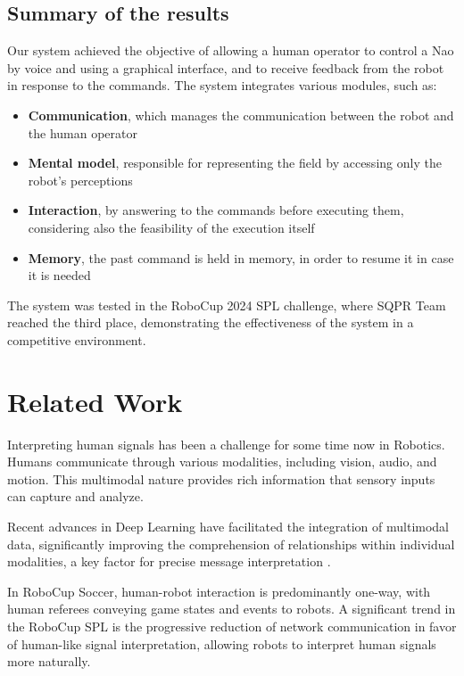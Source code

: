 \documentclass[a4paper, onecolumn, 12pt]{article}
\begin{document}
\subsection{Summary of the results}
\label{sec:summary}

Our system achieved the objective of allowing a human operator to control a Nao
by voice and using a graphical interface, and to receive feedback from the robot
in response to the commands. The system integrates various modules, such as:
\begin{itemize}
    \item \textbf{Communication}, which manages the communication between the robot and
    the human operator
    \item \textbf{Mental model}, responsible for representing the field by
    accessing only the robot's perceptions
    \item \textbf{Interaction}, by answering to the commands before executing
    them, considering also the feasibility of the execution itself
    \item \textbf{Memory}, the past command is held in memory, in order to
    resume it in case it is needed
\end{itemize}
The system was tested in the RoboCup 2024 SPL challenge, where SQPR Team reached
the third place, demonstrating the effectiveness of the system in a competitive
environment.

\newpage

\section{Related Work}
\label{sec:rel}

Interpreting human signals has been a challenge for some time now in Robotics.
Humans communicate through various modalities, including vision, audio, and
motion. This multimodal nature provides rich information that sensory inputs can
capture and analyze. 

Recent advances in Deep Learning have facilitated the
integration of multimodal data, significantly improving the comprehension of
relationships within individual modalities, a key factor for precise message
interpretation \cite{LIU20183} \cite{su2023recent}.

In RoboCup Soccer, human-robot interaction is predominantly one-way, with human
referees conveying game states and events to robots. A significant trend in the
RoboCup SPL is the progressive reduction of network communication in
favor of human-like signal interpretation, allowing robots to interpret human
signals more naturally. \cite{digiambattista}
\end{document}
